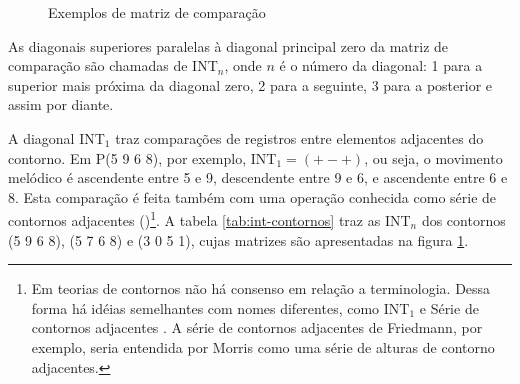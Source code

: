 \begin{figure}
  \centering
  \qquad
  \qquad
  \caption{Exemplos de matriz de comparação}
  \label{fig:matriz-exemplos}
\end{figure}

As diagonais superiores paralelas à diagonal principal zero da matriz
de comparação são chamadas de INT$_n$, onde $n$ é o número da
diagonal: 1 para a superior mais próxima da diagonal zero, 2 para a
seguinte, 3 para a posterior e assim por diante.

A diagonal INT$_1$ traz comparações de registros entre elementos
adjacentes do contorno. Em P(5 9 6 8), por exemplo, INT$_1=(+ - +)$,
ou seja, o movimento melódico é ascendente entre 5 e 9, descendente
entre 9 e 6, e ascendente entre 6 e 8. Esta comparação é feita também
com uma operação conhecida como série de contornos adjacentes
()\footnote{Em teorias de contornos não há consenso em relação
  a terminologia. Dessa forma há idéias semelhantes com nomes
  diferentes, como INT$_1$ e Série de contornos adjacentes
  \cite{friedmann87:response}. A série de contornos adjacentes de
  Friedmann, por exemplo, seria entendida por Morris como uma série de
  alturas de contorno adjacentes.}. A tabela \ref{tab:int-contornos}
traz as INT$_n$ dos contornos (5 9 6 8), (5 7 6 8) e (3 0 5 1), cujas
matrizes são apresentadas na figura \ref{fig:matriz-exemplos}.

